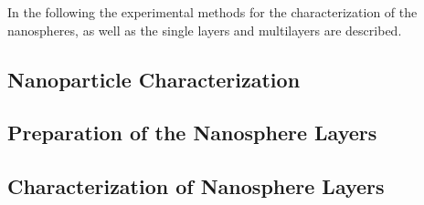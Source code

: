 \documentclass[\main/dresen_thesis.tex]{subfiles}
\renewcommand{\thisPath}{\main/chapters/looselyPackedNS/experimentalMethods/}
\begin{document}
  In the following the experimental methods for the characterization of the nanospheres, as well as the single layers and multilayers are described.

  \subsection{Nanoparticle Characterization}
    
    \FloatBarrier
    \clearpage
  
  \subsection{Preparation of the Nanosphere Layers}
    
    \FloatBarrier

  \subsection{Characterization of Nanosphere Layers}
  
    \FloatBarrier
\end{document}
